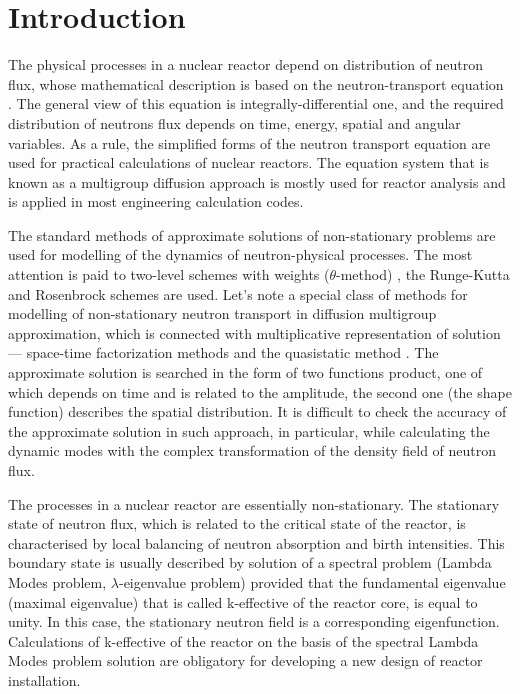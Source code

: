 \documentclass[authoryear]{elsarticle}
\begin{document}
\section{Introduction} 
The physical processes in a nuclear reactor \cite{duderstadt1976nuclear}
depend on distribution of neutron flux, whose mathematical description is based on the neutron-transport equation
\cite{hetrick1971dynamics,stacey}. 
The general view of this equation is integrally-differential one, and the required distribution of neutrons flux depends on time, energy, spatial and angular variables. As a rule, the simplified forms of the neutron transport equation are used for practical calculations of nuclear reactors. The equation system that is known as a multigroup diffusion approach is mostly used for reactor analysis
\cite{marchuk1986numerical,lewis1993computational,sutton1996diffusion,cho2005fundamentals}
and is applied in most engineering calculation codes.

The standard methods of approximate solutions of non-stationary problems are used for modelling of the dynamics of neutron-physical processes. The most attention is paid to two-level schemes with weights ($\theta$-method)
\cite{Ascher2008,LeVeque2007,HundsdorferVerwer2003},
the Runge-Kutta and Rosenbrock schemes 
\cite{Butcher2008,HairerWanner2010} are used.
Let’s note a special class of methods for modelling of non-stationary neutron transport in diffusion multigroup approximation, which is connected with multiplicative representation of solution --- space-time factorization methods and the quasistatic method
\cite{chou1990three,dahmani20013d,dodds1976accuracy,goluoglu2001time}.
The approximate solution is searched in the form of two functions product, one of which depends on time and is related to the amplitude, the second one (the shape function) describes the spatial distribution. It is difficult to check the accuracy of the approximate solution in such approach, in particular, while calculating the dynamic modes with the complex transformation of the density field of neutron flux.

The processes in a nuclear reactor are essentially non-stationary. The stationary state of neutron flux, which is related to the critical state of the reactor, is characterised by local balancing of neutron absorption and birth intensities. This boundary state is usually described by solution of a spectral problem (Lambda Modes problem, $\lambda$-eigenvalue problem) provided that the fundamental eigenvalue (maximal eigenvalue) that is called k-effective of the reactor core, is equal to unity. In this case, the stationary neutron field is a corresponding eigenfunction. Calculations of k-effective of the reactor on the basis of the spectral Lambda Modes problem solution are obligatory for developing a new design of reactor installation.
\end{document}
